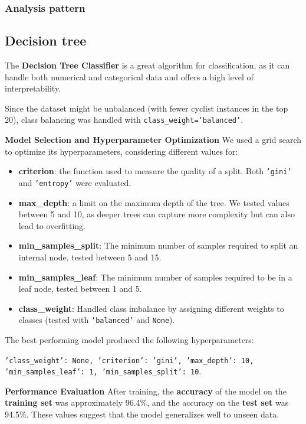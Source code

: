 \documentclass[a4paper, twoside]{article}
\begin{document}
\subsubsection{Analysis pattern}


\subsection{Decision tree}

The \textbf{Decision Tree Classifier} is a great algorithm for classification, as it can handle both numerical and categorical data and offers a high level of interpretability.

Since the dataset might be unbalanced (with fewer cyclist instances in the top 20), class balancing was handled with \texttt{class\_weight='balanced'}.

\textbf{Model Selection and Hyperparameter Optimization}
We used a grid search to optimize its hyperparameters, considering different values for:
\begin{itemize}[noitemsep]
\item \textbf{criterion}: the function used to measure the quality of a split. Both \texttt{'gini'} and \texttt{'entropy'} were evaluated.
\item \textbf{max\_depth}: a limit on the maximum depth of the tree. We tested values between 5 and 10, as deeper trees can capture more complexity but can also lead to overfitting.
\item \textbf{min\_samples\_split}: The minimum number of samples required to split an internal node, tested between 5 and 15.
\item \textbf{min\_samples\_leaf}: The minimum number of samples required to be in a leaf node, tested between 1 and 5.
\item \textbf{class\_weight}: Handled class imbalance by assigning different weights to classes (tested with \texttt{'balanced'} and \texttt{None}). \end{itemize}

The best performing model produced the following hyperparameters:
\begin{center}
\texttt{'class\_weight': None, 'criterion': 'gini', 'max\_depth': 10, 'min\_samples\_leaf': 1, 'min\_samples\_split': 10}.
\end{center}

\textbf{Performance Evaluation}
After training, the \textbf{accuracy} of the model on the \textbf{training set} was approximately 96.4\%, and the accuracy on the \textbf{test set} was 94.5\%. These values suggest that the model generalizes well to unseen data.
\end{document}
